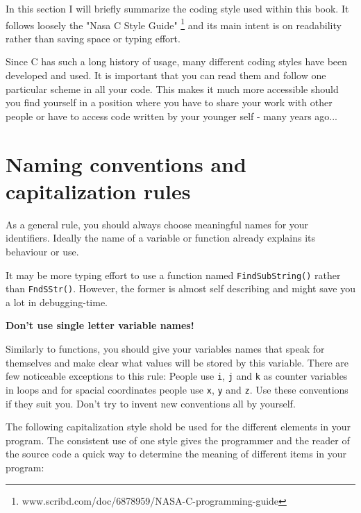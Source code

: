 In this section I will briefly summarize the coding style used within
this book. It follows loosely the "Nasa C Style Guide" 
\footnote{www.scribd.com/doc/6878959/NASA-C-programming-guide}
and its main
intent is on readability rather than saving space or typing effort.

Since C has such a long history of usage, many 
different coding styles have been developed and used. It is important
that you can read them and follow one particular scheme in all
your code. This makes it much more accessible should you find
yourself in a position where you have to share your work with other 
people or have to access code written by your younger self - many years ago...

\section{Naming conventions and capitalization rules}

As a general rule, you should always choose meaningful names for 
your identifiers. Ideally the name of a variable or function already explains
its behaviour or use.

It may be more typing effort to use a function named  {\tt FindSubString()} 
rather than  {\tt FndSStr()}. However, the former is almost self describing 
and might save you a lot in debugging-time.   

\textbf{Don't use single letter variable names!}

Similarly to functions, you should give your variables names that
speak for themselves and make clear what values will be stored
by this variable.
There are few noticeable exceptions to this rule:
People use {\tt i}, {\tt j} and {\tt k} as counter variables in loops and
for spacial coordinates people use {\tt x}, {\tt y} and {\tt z}.
Use these conventions if they suit you. Don't try to invent new
conventions all by yourself.


The following capitalization style shold be used for the different elements in your
program. The consistent use of one style gives the programmer and the reader
of the source code a quick way to determine the meaning of different items
in your program:


